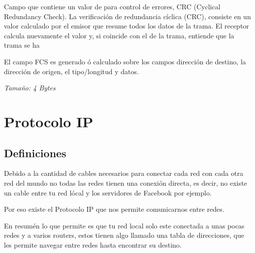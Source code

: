 \documentclass[12pt, fleqn]{report}                             %
\theoremstyle{break}                                            %
\begin{document}
\begin{itemize}
                        Campo que contiene un valor de para control de errores, CRC (Cyclical Redundancy Check).
                        La verificación de redundancia cíclica (CRC), consiste en un valor calculado por el emisor que resume todos
                        los datos de la trama.
                        El receptor calcula nuevamente el valor y, si coincide con el de la trama, entiende que la trama se ha

                        El campo FCS es generado ó calculado sobre los campos dirección de destino, la dirección de origen,
                        el tipo/longitud y datos. 
                        
                        \emph{Tamaño: 4 Bytes} 

                \end{itemize}





    \chapter{Protocolo IP}


        \clearpage
        \section{Definiciones}

            Debido a la cantidad de cables necesarios para conectar cada red con cada otra red del mundo
            no todas las redes tienen una conexión directa, es decir, no existe un cable entre tu red
            lócal y los servidores de Facebook por ejemplo.

            Por eso existe el Protocolo IP que nos permite comunicarnos entre redes.

            En resumén lo que permite es que tu red local solo este conectada a unas pocas redes y a
            varios routers, estos tienen algo llamado una tabla de direcciones, que les permite navegar
            entre redes hasta encontrar su destino. 
\end{document}
